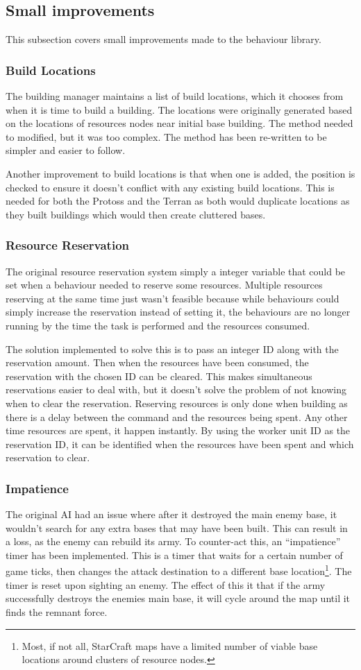 \documentclass[11pt,openright,a4paper]{report}
\begin{document}
\subsection{Small improvements}
This subsection covers small improvements made to the behaviour library.
\subsubsection{Build Locations}
The building manager maintains a list of build locations, which it chooses from when it is time to build a building. The locations were originally generated based on the locations of resources nodes near initial base building. The method needed to modified, but it was too complex. The method has been re-written to be simpler and easier to follow.

Another improvement to build locations is that when one is added, the position is checked to ensure it doesn't conflict with any existing build locations. This is needed for both the Protoss and the Terran as both would duplicate locations as they built buildings which would then create cluttered bases.
\subsubsection{Resource Reservation}
The original resource reservation system simply a integer variable that could be set when a behaviour needed to reserve some resources. Multiple resources reserving at the same time just wasn't feasible because while behaviours could simply increase the reservation instead of setting it, the behaviours are no longer running by the time the task is performed and the resources consumed.

The solution implemented to solve this is to pass an integer ID along with the reservation amount. Then when the resources have been consumed, the reservation with the chosen ID can be cleared. This makes simultaneous reservations easier to deal with, but it doesn't solve the problem of not knowing when to clear the reservation. Reserving resources is only done when building as there is a delay between the command and the resources being spent. Any other time resources are spent, it happen instantly. By using the worker unit ID as the reservation ID, it can be identified when the resources have been spent and which reservation to clear.
\subsubsection{Impatience}
The original AI had an issue where after it destroyed the main enemy base, it wouldn't search for any extra bases that may have been built. This can result in a loss, as the enemy can rebuild its army. To counter-act this, an ``impatience'' timer has been implemented. This is a timer that waits for a certain number of game ticks, then changes the attack destination to a different base location\footnote{Most, if not all, StarCraft maps have a limited number of viable base locations around clusters of resource nodes.}. The timer is reset upon sighting an enemy. The effect of this it that if the army successfully destroys the enemies main base, it will cycle around the map until it finds the remnant force.
\end{document}
